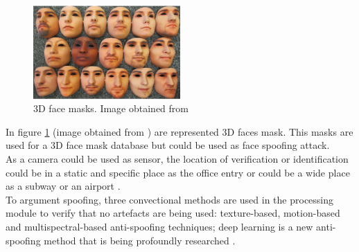 \begin{figure}[htb]
\centering
\includegraphics[width=0.5\textwidth]{images_miscelaneus/fig_masks.png}
\caption{3D face masks. Image obtained from \cite{3dmask}} \label{fig:3dMasks}
\end{figure}

In figure \ref{fig:3dMasks} (image obtained from \cite{3dmask}) are represented 3D faces mask. This masks are used for a 3D face mask database but could be used as face spoofing attack.\\

As a camera could be used as sensor, the location of verification or identification could be in a static and specific place as the office entry or could be a wide place as a subway or an airport \cite{survey2}.\\

To argument spoofing, three convectional methods are used in the processing module to verify that no artefacts are being used: texture-based, motion-based and multispectral-based anti-spoofing techniques; deep learning is a new anti-spoofing method that is being  profoundly researched \cite{LSTM-CNN}.
